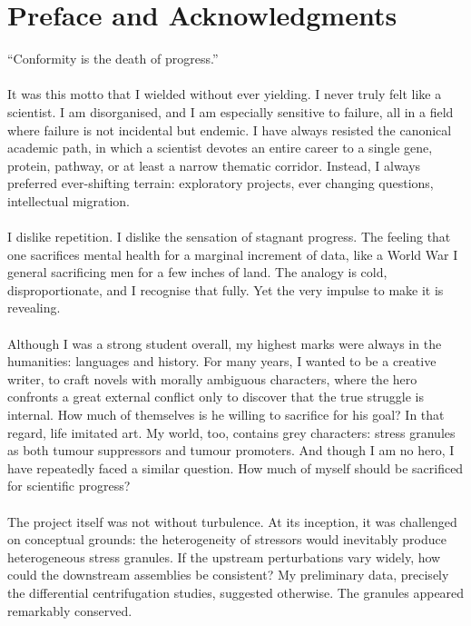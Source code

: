 
\chapter*{Preface and Acknowledgments}

“Conformity is the death of progress.”
\\
\\
It was this motto that I wielded without ever yielding. I never truly felt like a scientist. I am disorganised, and I am especially sensitive to failure, all in a field where failure is not incidental but endemic. I have always resisted the canonical academic path, in which a scientist devotes an entire career to a single gene, protein, pathway, or at least a narrow thematic corridor. Instead, I always preferred ever-shifting terrain: exploratory projects, ever changing questions, intellectual migration.
\\
\\
I dislike repetition. I dislike the sensation of stagnant progress. The feeling that one sacrifices mental health for a marginal increment of data, like a World War I general sacrificing men for a few inches of land. The analogy is cold, disproportionate, and I recognise that fully. Yet the very impulse to make it is revealing.
\\
\\
Although I was a strong student overall, my highest marks were always in the humanities: languages and history. For many years, I wanted to be a creative writer, to craft novels with morally ambiguous characters, where the hero confronts a great external conflict only to discover that the true struggle is internal. How much of themselves is he willing to sacrifice for his goal? In that regard, life imitated art. My world, too, contains grey characters: stress granules as both tumour suppressors and tumour promoters. And though I am no hero, I have repeatedly faced a similar question. How much of myself should be sacrificed for scientific progress?
\\
\\
The project itself was not without turbulence. At its inception, it was challenged on conceptual grounds: the heterogeneity of stressors would inevitably produce heterogeneous stress granules. If the upstream perturbations vary widely, how could the downstream assemblies be consistent? My preliminary data, precisely the differential centrifugation studies, suggested otherwise. The granules appeared remarkably conserved.
